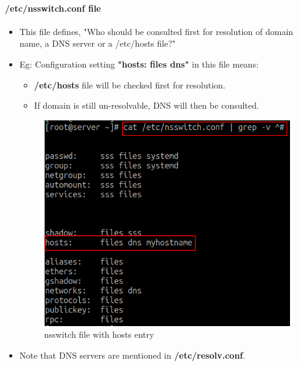 \begin{flushleft}
\begin{itemize}
	\end{itemize}

	\newpage
	\paragraph{/etc/nsswitch.conf file}
	\begin{itemize}
		\item This file defines, "Who should be consulted first for resolution of domain name, a DNS server or a /etc/hosts file?" 
		\bigskip
		\item Eg: Configuration setting \textbf{"hosts: files dns"} in this file means:
		\begin{itemize}
			\item \textbf{/etc/hosts} file will be checked first for resolution.
			\item If domain is still un-resolvable, DNS will then be consulted.
		\end{itemize}
		\begin{figure}[h!]
			\centering
			\includegraphics[scale=.45]{content/chapter3/images/ns.png}
			\caption{nsswitch file with hosts entry}
			\label{fig:ns}
		\end{figure}
		\item Note that DNS servers are mentioned in \textbf{/etc/resolv.conf}.
	\end{itemize}
	
	
	\newpage
	\bigskip
	\bigskip
	

\end{flushleft}
